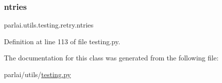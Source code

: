 \subsubsection{\texorpdfstring{ntries}{ntries}}
{\footnotesize\ttfamily parlai.\+utils.\+testing.\+retry.\+ntries}



Definition at line 113 of file testing.\+py.



The documentation for this class was generated from the following file\+:\begin{DoxyCompactItemize}
\item 
parlai/utils/\hyperlink{testing_8py}{testing.\+py}\end{DoxyCompactItemize}
